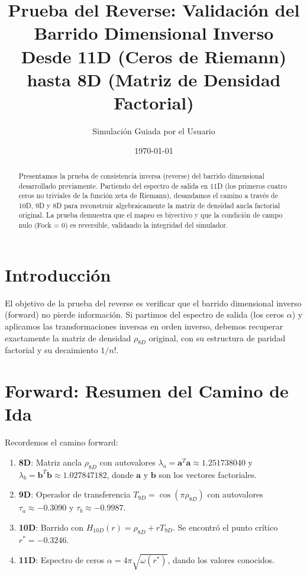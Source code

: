 \documentclass[12pt,a4paper]{article}
\title{Prueba del Reverse: Validación del Barrido Dimensional Inverso \\ 
       \large Desde 11D (Ceros de Riemann) hasta 8D (Matriz de Densidad Factorial)}
\author{Simulación Guiada por el Usuario}
\date{\today}
\begin{document}
\maketitle

\begin{abstract}
Presentamos la prueba de consistencia inversa (reverse) del barrido dimensional desarrollado previamente. Partiendo del espectro de salida en 11D (los primeros cuatro ceros no triviales de la función zeta de Riemann), desandamos el camino a través de 10D, 9D y 8D para reconstruir algebraicamente la matriz de densidad ancla factorial original. La prueba demuestra que el mapeo es biyectivo y que la condición de campo nulo (Fock = 0) es reversible, validando la integridad del simulador.
\end{abstract}

\section{Introducción}

El objetivo de la prueba del reverse es verificar que el barrido dimensional inverso (forward) no pierde información. Si partimos del espectro de salida (los ceros \(\alpha\)) y aplicamos las transformaciones inversas en orden inverso, debemos recuperar exactamente la matriz de densidad \(\rho_{8D}\) original, con su estructura de paridad factorial y su decaimiento \(1/n!\).

\section{Forward: Resumen del Camino de Ida}

Recordemos el camino forward:

\begin{enumerate}
\item \textbf{8D}: Matriz ancla \(\rho_{8D}\) con autovalores \(\lambda_a = \mathbf{a}^T\mathbf{a} \approx 1.251738040\) y \(\lambda_b = \mathbf{b}^T\mathbf{b} \approx 1.027847182\), donde \(\mathbf{a}\) y \(\mathbf{b}\) son los vectores factoriales.
\item \textbf{9D}: Operador de transferencia \(T_{9D} = \cos(\pi \rho_{8D})\) con autovalores \(\tau_a \approx -0.3090\) y \(\tau_b \approx -0.9987\).
\item \textbf{10D}: Barrido con \(H_{10D}(r) = \rho_{8D} + r T_{9D}\). Se encontró el punto crítico \(r^* = -0.3246\).
\item \textbf{11D}: Espectro de ceros \(\alpha = 4\pi \sqrt{\omega(r^*)}\), dando los valores conocidos.
\end{enumerate}
\end{document}
